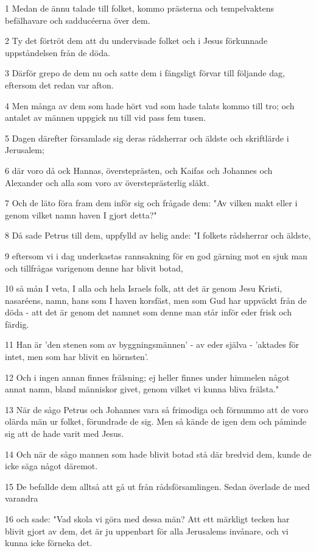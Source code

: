 \par 1 Medan de ännu talade till folket, kommo prästerna och tempelvaktens befälhavare och sadducéerna över dem.
\par 2 Ty det förtröt dem att du undervisade folket och i Jesus förkunnade uppståndelsen från de döda.
\par 3 Därför grepo de dem nu och satte dem i fängsligt förvar till följande dag, eftersom det redan var afton.
\par 4 Men många av dem som hade hört vad som hade talats kommo till tro; och antalet av männen uppgick nu till vid pass fem tusen.
\par 5 Dagen därefter församlade sig deras rådsherrar och äldste och skriftlärde i Jerusalem;
\par 6 där voro då ock Hannas, översteprästen, och Kaifas och Johannes och Alexander och alla som voro av översteprästerlig släkt.
\par 7 Och de läto föra fram dem inför sig och frågade dem: "Av vilken makt eller i genom vilket namn haven I gjort detta?"
\par 8 Då sade Petrus till dem, uppfylld av helig ande: "I folkets rådsherrar och äldste,
\par 9 eftersom vi i dag underkastas rannsakning för en god gärning mot en sjuk man och tillfrågas varigenom denne har blivit botad,
\par 10 så mån I veta, I alla och hela Israels folk, att det är genom Jesu Kristi, nasaréens, namn, hans som I haven korsfäst, men som Gud har uppväckt från de döda - att det är genom det namnet som denne man står inför eder frisk och färdig.
\par 11 Han är 'den stenen som av byggningsmännen' - av eder själva - 'aktades för intet, men som har blivit en hörnsten'.
\par 12 Och i ingen annan finnes frälsning; ej heller finnes under himmelen något annat namn, bland människor givet, genom vilket vi kunna bliva frälsta."
\par 13 När de sågo Petrus och Johannes vara så frimodiga och förnummo att de voro olärda män ur folket, förundrade de sig. Men så kände de igen dem och påminde sig att de hade varit med Jesus.
\par 14 Och när de sågo mannen som hade blivit botad stå där bredvid dem, kunde de icke säga något däremot.
\par 15 De befallde dem alltså att gå ut från rådsförsamlingen. Sedan överlade de med varandra
\par 16 och sade: "Vad skola vi göra med dessa män? Att ett märkligt tecken har blivit gjort av dem, det är ju uppenbart för alla Jerusalems invånare, och vi kunna icke förneka det.
